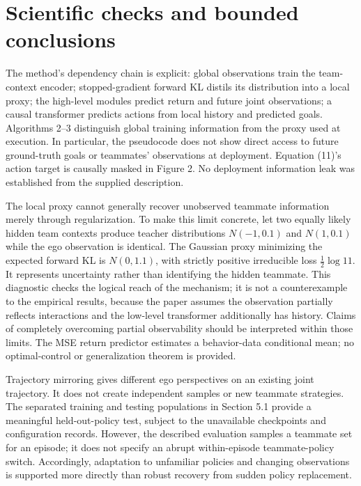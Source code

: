\documentclass[10pt]{article}
\begin{document}
\section*{Scientific checks and bounded conclusions}
The method’s dependency chain is explicit: global observations train the team-context encoder; stopped-gradient forward KL distils its distribution into a local proxy; the high-level modules predict return and future joint observations; a causal transformer predicts actions from local history and predicted goals. Algorithms 2–3 distinguish global training information from the proxy used at execution. In particular, the pseudocode does not show direct access to future ground-truth goals or teammates’ observations at deployment. Equation (11)’s action target is causally masked in Figure 2. No deployment information leak was established from the supplied description.\par
The local proxy cannot generally recover unobserved teammate information merely through regularization. To make this limit concrete, let two equally likely hidden team contexts produce teacher distributions \(N(-1,0.1)\) and \(N(1,0.1)\) while the ego observation is identical. The Gaussian proxy minimizing the expected forward KL is \(N(0,1.1)\), with strictly positive irreducible loss \(\tfrac12\log 11\). It represents uncertainty rather than identifying the hidden teammate. This diagnostic checks the logical reach of the mechanism; it is not a counterexample to the empirical results, because the paper assumes the observation partially reflects interactions and the low-level transformer additionally has history. Claims of completely overcoming partial observability should be interpreted within those limits. The MSE return predictor estimates a behavior-data conditional mean; no optimal-control or generalization theorem is provided.\par
Trajectory mirroring gives different ego perspectives on an existing joint trajectory. It does not create independent samples or new teammate strategies. The separated training and testing populations in Section 5.1 provide a meaningful held-out-policy test, subject to the unavailable checkpoints and configuration records. However, the described evaluation samples a teammate set for an episode; it does not specify an abrupt within-episode teammate-policy switch. Accordingly, adaptation to unfamiliar policies and changing observations is supported more directly than robust recovery from sudden policy replacement.\par
\end{document}
